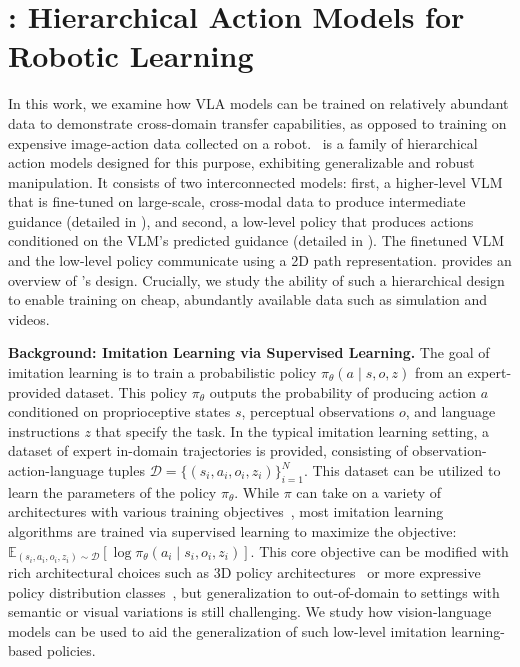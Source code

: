 \section{\method: Hierarchical Action Models for Robotic Learning}
\label{sec:method}

In this work, we examine how VLA models can be trained on relatively abundant data to demonstrate cross-domain transfer capabilities, as opposed to training on expensive image-action data collected on a robot. \method\ is a family of hierarchical action models designed for this purpose, exhibiting generalizable and robust manipulation. It consists of two interconnected models: first, a higher-level VLM that is fine-tuned on large-scale, cross-modal data to produce intermediate guidance (detailed in ), and second, a low-level policy that produces actions conditioned on the VLM's predicted guidance (detailed in ). The finetuned VLM and the low-level policy communicate using a 2D path representation.  provides an overview of \method's design. Crucially, we study the ability of such a hierarchical design to enable training on cheap, abundantly available data such as simulation and videos. 

\textbf{Background: Imitation Learning via Supervised Learning.} The goal of imitation learning is to train a probabilistic policy $\pi_\theta(a \mid s, o, z)$ from an expert-provided dataset. This policy $\pi_\theta$ outputs the probability of producing action $a$ conditioned on proprioceptive states $s$, perceptual observations $o$, and language instructions $z$ that specify the task. In the typical imitation learning setting, a dataset of expert in-domain trajectories is provided, consisting of observation-action-language tuples $\mathcal{D} = \{(s_i, a_i, o_i, z_i)\}_{i=1}^N$. This dataset can be utilized to learn the parameters of the policy $\pi_\theta$. While $\pi$ can take on a variety of architectures with various training objectives~\citep{goyal2023rvt, ke20243d, zhao23aloha, chi23diffusion}, most imitation learning algorithms are trained via supervised learning to maximize the objective: $\mathbb{E}_{(s_i, a_i, o_i, z_i) \sim \mathcal{D}} \left[ \log \pi_\theta\left(a_i \mid s_i, o_i, z_i \right) \right].$ This core objective can be modified with rich architectural choices such as 3D policy architectures~\citep{goyal2023rvt, ke20243d} or more expressive policy distribution classes~\citep{zhao23aloha, chi23diffusion}, but generalization to out-of-domain to settings with semantic or visual variations is still challenging. We study how vision-language models can be used to aid the generalization of such low-level imitation learning-based policies.


